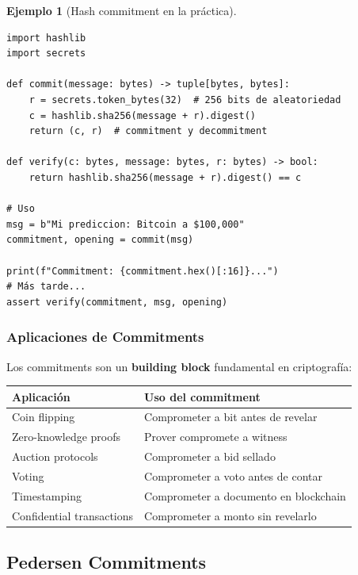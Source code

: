 \documentclass[11pt,a4paper,twoside,openright]{book}
\theoremstyle{definition}
\newtheorem{example}{Ejemplo}[chapter]
\theoremstyle{plain}
\theoremstyle{remark}
\begin{document}
\begin{example}[Hash commitment en la práctica]
\begin{verbatim}
import hashlib
import secrets

def commit(message: bytes) -> tuple[bytes, bytes]:
    r = secrets.token_bytes(32)  # 256 bits de aleatoriedad
    c = hashlib.sha256(message + r).digest()
    return (c, r)  # commitment y decommitment

def verify(c: bytes, message: bytes, r: bytes) -> bool:
    return hashlib.sha256(message + r).digest() == c

# Uso
msg = b"Mi prediccion: Bitcoin a $100,000"
commitment, opening = commit(msg)

print(f"Commitment: {commitment.hex()[:16]}...")
# Más tarde...
assert verify(commitment, msg, opening)
\end{verbatim}
\end{example}

\subsubsection{Aplicaciones de Commitments}

\begin{keyidea}
Los commitments son un \textbf{building block} fundamental en criptografía:

\begin{center}
\begin{tabular}{ll}
\toprule
\textbf{Aplicación} & \textbf{Uso del commitment} \\
\midrule
Coin flipping & Comprometer a bit antes de revelar \\
Zero-knowledge proofs & Prover compromete a witness \\
Auction protocols & Comprometer a bid sellado \\
Voting & Comprometer a voto antes de contar \\
Timestamping & Comprometer a documento en blockchain \\
Confidential transactions & Comprometer a monto sin revelarlo \\
\bottomrule
\end{tabular}
\end{center}
\end{keyidea}

\subsection{Pedersen Commitments}
\end{document}
